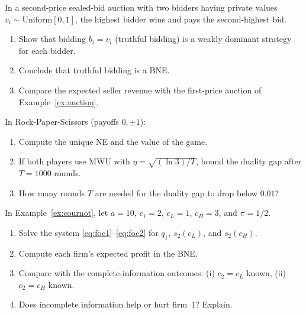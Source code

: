 \documentclass[11pt,a4paper]{article}
\begin{document}
\begin{exercise}
\label{ex:second-price}
In a second-price sealed-bid auction with two bidders having private
values $v_i \sim \mathrm{Uniform}[0,1]$, the highest bidder wins and
pays the second-highest bid.
\begin{enumerate}[label=(\alph*)]
    \item Show that bidding $b_i = v_i$ (truthful bidding) is a weakly
    dominant strategy for each bidder.
    \item Conclude that truthful bidding is a BNE.
    \item Compare the expected seller revenue with the first-price
    auction of Example~\ref{ex:auction}.
\end{enumerate}
\end{exercise}

\begin{exercise}
\label{ex:mwu-rate}
In Rock-Paper-Scissors (payoffs $0, \pm 1$):
\begin{enumerate}[label=(\alph*)]
    \item Compute the unique NE and the value of the game.
    \item If both players use MWU with $\eta = \sqrt{(\ln 3)/T}$, bound
    the duality gap after $T = 1000$ rounds.
    \item How many rounds $T$ are needed for the duality gap to drop
    below $0.01$?
\end{enumerate}
\end{exercise}

\begin{exercise}
\label{ex:cournot-bne}
In Example~\ref{ex:cournot}, let $a = 10$, $c_1 = 2$, $c_L = 1$,
$c_H = 3$, and $\pi = 1/2$.
\begin{enumerate}[label=(\alph*)]
    \item Solve the system \eqref{eq:foc1}--\eqref{eq:foc2} for $q_1$,
    $s_2(c_L)$, and $s_2(c_H)$.
    \item Compute each firm's expected profit in the BNE.
    \item Compare with the complete-information outcomes: (i) $c_2 = c_L$
    known, (ii) $c_2 = c_H$ known.
    \item Does incomplete information help or hurt firm~1? Explain.
\end{enumerate}
\end{exercise}
\end{document}
